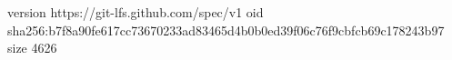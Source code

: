version https://git-lfs.github.com/spec/v1
oid sha256:b7f8a90fe617cc73670233ad83465d4b0b0ed39f06c76f9cbfcb69c178243b97
size 4626
